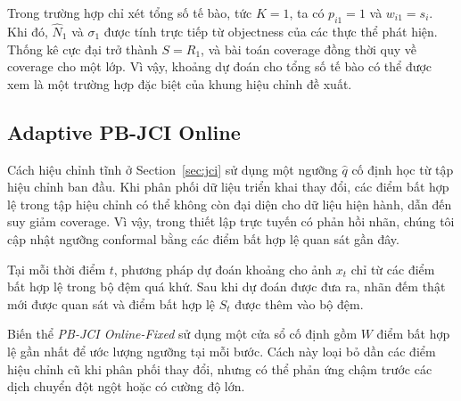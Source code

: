 \documentclass[pdflatex,sn-mathphys-num]{sn-jnl}
\begin{document}
Trong trường hợp chỉ xét tổng số tế bào, tức \(K=1\), ta có \(p_{i1}=1\) và
\(w_{i1}=s_i\). Khi đó, \(\hat{N}_1\) và \(\sigma_1\) được tính trực tiếp từ
objectness của các thực thể phát hiện. Thống kê cực đại trở thành \(S=R_1\), và bài
toán coverage đồng thời quy về coverage cho một lớp. Vì vậy, khoảng dự đoán cho tổng
số tế bào có thể được xem là một trường hợp đặc biệt của khung hiệu chỉnh đề xuất.

\subsection{Adaptive PB-JCI Online}\label{sec:adaptive}

Cách hiệu chỉnh tĩnh ở Section~\ref{sec:jci} sử dụng một ngưỡng \(\hat{q}\) cố định
học từ tập hiệu chỉnh ban đầu. Khi phân phối dữ liệu triển khai thay đổi, các điểm
bất hợp lệ trong tập hiệu chỉnh có thể không còn đại diện cho dữ liệu hiện hành, dẫn
đến suy giảm coverage. Vì vậy, trong thiết lập trực tuyến có phản hồi nhãn, chúng tôi
cập nhật ngưỡng conformal bằng các điểm bất hợp lệ quan sát gần đây.

Tại mỗi thời điểm \(t\), phương pháp dự đoán khoảng cho ảnh \(x_t\) chỉ từ các điểm bất
hợp lệ trong bộ đệm quá khứ. Sau khi dự đoán được đưa ra, nhãn đếm thật mới được quan
sát và điểm bất hợp lệ \(S_t\) được thêm vào bộ đệm.

Biến thể \emph{PB-JCI Online-Fixed} sử dụng một cửa sổ cố định gồm \(W\) điểm bất hợp
lệ gần nhất để ước lượng ngưỡng tại mỗi bước. Cách này loại bỏ dần các điểm hiệu chỉnh
cũ khi phân phối thay đổi, nhưng có thể phản ứng chậm trước các dịch chuyển đột ngột
hoặc có cường độ lớn.
\end{document}
